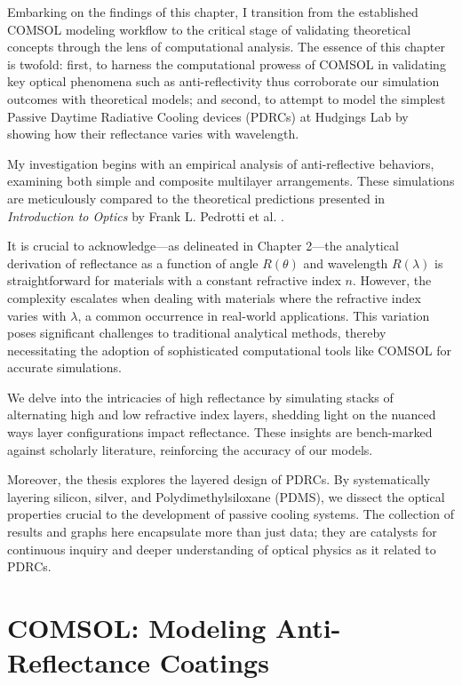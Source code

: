 Embarking on the findings of this chapter, I transition from the established COMSOL modeling workflow to the critical stage of validating theoretical concepts through the lens of computational analysis. The essence of this chapter is twofold: first, to harness the computational prowess of COMSOL in validating key optical phenomena such as anti-reflectivity thus corroborate our simulation outcomes with theoretical models; and second, to attempt to model the simplest Passive Daytime Radiative Cooling devices (PDRCs) at Hudgings Lab by showing how their reflectance varies with wavelength.

My investigation begins with an empirical analysis of anti-reflective behaviors, examining both simple and composite multilayer arrangements. These simulations are meticulously compared to the theoretical predictions presented in \emph{Introduction to Optics} by Frank L. Pedrotti et al. \cite{pedrotti_introduction_2007}.

It is crucial to acknowledge—as delineated in Chapter 2—the analytical derivation of reflectance as a function of angle $R(\theta)$ and wavelength $R(\lambda)$ is straightforward for materials with a constant refractive index $n$. However, the complexity escalates when dealing with materials where the refractive index varies with $\lambda$, a common occurrence in real-world applications. This variation poses significant challenges to traditional analytical methods, thereby necessitating the adoption of sophisticated computational tools like COMSOL for accurate simulations.

We delve into the intricacies of high reflectance by simulating stacks of alternating high and low refractive index layers, shedding light on the nuanced ways layer configurations impact reflectance. These insights are bench-marked against scholarly literature, reinforcing the accuracy of our models.

Moreover, the thesis explores the layered design of PDRCs. By systematically layering silicon, silver, and Polydimethylsiloxane (PDMS), we dissect the optical properties crucial to the development of passive cooling systems. The collection of results and graphs here encapsulate more than just data; they are catalysts for continuous inquiry and deeper understanding of optical physics as it related to PDRCs.


\section{COMSOL: Modeling Anti-Reflectance Coatings}

